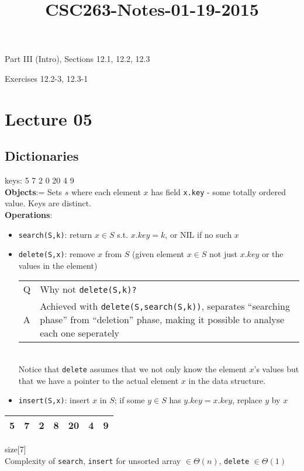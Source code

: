 



\title{CSC263-Notes-01-19-2015}



\reversemarginpar
\mpreadings

\noindent Part III (Intro), Sections 12.1, 12.2, 12.3

\mpselftest

\noindent Exercises 12.2-3, 12.3-1

\section*{Lecture 05}

\subsection*{Dictionaries}

\noindent keys: 5 7 2 0 20 4 9 \\

\noindent \textbf{Objects}:= Sets $s$ where each element $x$ has field \texttt{x.key} - some totally 
	ordered value. Keys are distinct. \\

\noindent \textbf{Operations}: 
\begin{itemize}
	\item \texttt{search(S,k)}: return $x \in S$ s.t. $x.key = k$, or NIL if no such $x$
	\item \texttt{delete(S,x)}: remove $x$ from $S$ (given element $x \in S$ not just $x.key$ or the values in the element) \\
		\begin{tabular}{l @{: } p{15cm}}
			Q & Why not \texttt{delete(S,k)?} \\
			A & Achieved with \texttt{delete(S,search(S,k))}, separates ``searching phase'' from ``deletion'' phase, making it possible to analyse each one seperately
		\end{tabular} \\
		Notice that \texttt{delete} assumes that we not only know the element $x$'s values but that we have a pointer to the actual element $x$ in the data structure.
	\item \texttt{insert(S,x)}: insert $x$ in $S$; if some $y \in S$ has $y.key = x.key$, replace $y$ by $x$
\end{itemize}

\noindent \begin{tabular}{| l | l | l | l | l | l | l |}
	\hline 5 & 7 & 2 & 8 & 20 & 4 & 9 \\ \hline
\end{tabular} size[7] \\
Complexity of \texttt{search}, \texttt{insert} for unsorted array $\in \Theta(n)$, \texttt{delete} 
	$\in \Theta(1)$\\

